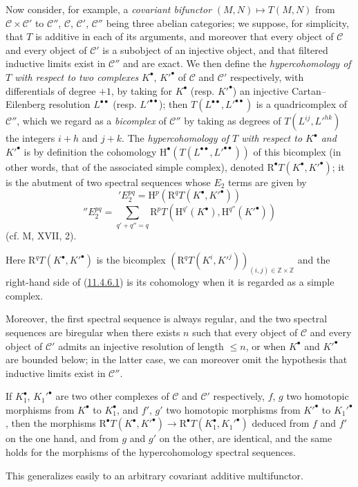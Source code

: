 \begin{env}[11.4.6]
\label{0.11.4.6}
Now consider, for example, a \emph{covariant bifunctor}
$(M,N)\mapsto T(M,N)$ from $\mathcal C\times\mathcal C'$ to $\mathcal C''$,
$\mathcal C$, $\mathcal C'$, $\mathcal C''$ being three abelian
categories; we suppose, for simplicity, that $T$ is additive in each of its
arguments, and moreover that every object of $\mathcal C$ and every object of
$\mathcal C'$ is a subobject of an injective object, and that filtered inductive
limits exist in $\mathcal C''$ and are exact. We then define
the \emph{hypercohomology of $T$ with respect to two complexes}
$K^\bullet$, $K'^\bullet$ of $\mathcal C$ and $\mathcal C'$ respectively, with
differentials of degree $+1$, by taking for $K^\bullet$ (resp.
$K'^\bullet$) an injective Cartan--Eilenberg resolution
$L^{\bullet\bullet}$ (resp. $L'^{\bullet\bullet}$); then
$T(L^{\bullet\bullet},L'^{\bullet\bullet})$ is a quadricomplex of
$\mathcal C''$, which we regard as a \emph{bicomplex} of $\mathcal C''$
by taking as degrees of $T(L^{ij},L'^{hk})$ the integers $i+h$ and $j+k$.
The \emph{hypercohomology of $T$ with respect to $K^\bullet$ and $K'^\bullet$}
is by definition the cohomology
$\mathrm H^\bullet(T(L^{\bullet\bullet},L'^{\bullet\bullet}))$ of this
bicomplex (in other words, that of the associated simple complex), denoted
$\mathrm R^\bullet T(K^\bullet,K'^\bullet)$; it is the abutment of
two spectral sequences whose $E_2$ terms are given by
\[
  \label{0.11.4.6.1}
  'E_2^{pq}=\mathrm H^p(\mathrm R^qT(K^\bullet,K'^\bullet))
  \tag{11.4.6.1}
\]
\[
  \label{0.11.4.6.2}
  ''E_2^{pq}=\sum_{q'+q''=q}
  \mathrm R^pT(\mathrm H^{q'}(K^\bullet),\mathrm H^{q''}(K'^\bullet))
  \tag{11.4.6.2}
\]
(cf. M, XVII, 2).

Here $\mathrm R^qT(K^\bullet,K'^\bullet)$ is the bicomplex
$(\mathrm R^qT(K^i,K'^j))_{(i,j)\in\mathbb Z\times\mathbb Z}$ and the
right-hand side of (\hyperref[0.11.4.6.1]{11.4.6.1}) is its cohomology when it is
regarded as a simple complex.

Moreover, the first spectral sequence is always regular, and the two
spectral sequences are biregular when there exists $n$ such that every object of
$\mathcal C$ and every object of $\mathcal C'$ admits an injective resolution
of length $\leq n$, or when $K^\bullet$ and $K'^\bullet$ are bounded
below; in the latter case, we can moreover omit the hypothesis that
inductive limits exist in $\mathcal C''$.

If $K_1^\bullet$, $K_1'^\bullet$ are two other complexes of $\mathcal C$ and
$\mathcal C'$ respectively, $f$, $g$ two homotopic morphisms from
$K^\bullet$ to $K_1^\bullet$, and $f'$, $g'$ two homotopic morphisms from
$K'^\bullet$ to $K_1'^\bullet$, then the morphisms
$\mathrm R^\bullet T(K^\bullet,K'^\bullet)\to
\mathrm R^\bullet T(K_1^\bullet,K_1'^\bullet)$ deduced from $f$ and $f'$ on the one
hand, and from $g$ and $g'$ on the other, are identical, and the same holds for
the morphisms of the hypercohomology spectral sequences.

This generalizes easily to an arbitrary covariant additive multifunctor.
\end{env}

